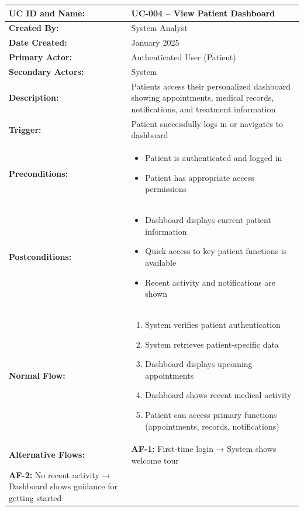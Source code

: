 \documentclass[12pt,a4paper]{article}
\begin{document}
\renewcommand{\arraystretch}{1.5}
\begin{longtable}{|p{4.5cm}|p{10.5cm}|}
\hline
\textbf{UC ID and Name:} & UC-004 – View Patient Dashboard \\
\hline
\textbf{Created By:} & System Analyst \\
\hline
\textbf{Date Created:} & January 2025 \\
\hline
\textbf{Primary Actor:} & Authenticated User (Patient) \\
\hline
\textbf{Secondary Actors:} & System \\
\hline
\textbf{Description:} & Patients access their personalized dashboard showing appointments, medical records, notifications, and treatment information \\
\hline
\textbf{Trigger:} & Patient successfully logs in or navigates to dashboard \\
\hline
\textbf{Preconditions:} &
\begin{itemize}
  \item Patient is authenticated and logged in
  \item Patient has appropriate access permissions
\end{itemize} \\
\hline
\textbf{Postconditions:} &
\begin{itemize}
  \item Dashboard displays current patient information
  \item Quick access to key patient functions is available
  \item Recent activity and notifications are shown
\end{itemize} \\
\hline
\textbf{Normal Flow:} &
\begin{enumerate}
  \item System verifies patient authentication
  \item System retrieves patient-specific data
  \item Dashboard displays upcoming appointments
  \item Dashboard shows recent medical activity
  \item Patient can access primary functions (appointments, records, notifications)
\end{enumerate} \\
\hline
\textbf{Alternative Flows:} &
\textbf{AF-1:} First-time login → System shows welcome tour \\
\textbf{AF-2:} No recent activity → Dashboard shows guidance for getting started \\

\end{longtable}
\end{document}

